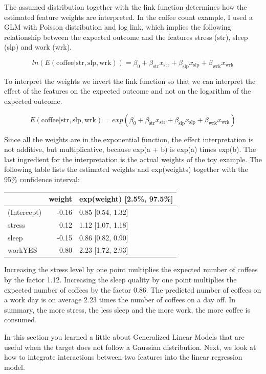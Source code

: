 \documentclass[
  12pt,
]{krantz}
\begin{document}
The assumed distribution together with the link function determines how the estimated feature weights are interpreted.
In the coffee count example, I used a GLM with Poisson distribution and log link, which implies the following relationship between the expected outcome and the features stress (str), sleep (slp) and work (wrk).

\[ln(E(\text{coffee}|\text{str},\text{slp},\text{wrk}))=\beta_0+\beta_{\text{str}}x_{\text{str}}+\beta_{\text{slp}}x_{\text{slp}}+\beta_{\text{wrk}}x_{\text{wrk}}\]

To interpret the weights we invert the link function so that we can interpret the effect of the features on the expected outcome and not on the logarithm of the expected outcome.

\[E(\text{coffee}|\text{str},\text{slp},\text{wrk})=exp(\beta_0+\beta_{\text{str}}x_{\text{str}}+\beta_{\text{slp}}x_{\text{slp}}+\beta_{\text{wrk}}x_{\text{wrk}})\]

Since all the weights are in the exponential function, the effect interpretation is not additive, but multiplicative, because exp(a + b) is exp(a) times exp(b).
The last ingredient for the interpretation is the actual weights of the toy example.
The following table lists the estimated weights and exp(weights) together with the 95\% confidence interval:

\begin{tabular}{l|r|l}
\hline
  & weight & exp(weight) [2.5\%, 97.5\%]\\
\hline
(Intercept) & -0.16 & 0.85 [0.54, 1.32]\\
\hline
stress & 0.12 & 1.12 [1.07, 1.18]\\
\hline
sleep & -0.15 & 0.86 [0.82, 0.90]\\
\hline
workYES & 0.80 & 2.23 [1.72, 2.93]\\
\hline
\end{tabular}

Increasing the stress level by one point multiplies the expected number of coffees by the factor 1.12.
Increasing the sleep quality by one point multiplies the expected number of coffees by the factor 0.86.
The predicted number of coffees on a work day is on average 2.23 times the number of coffees on a day off.
In summary, the more stress, the less sleep and the more work, the more coffee is consumed.

In this section you learned a little about Generalized Linear Models that are useful when the target does not follow a Gaussian distribution.
Next, we look at how to integrate interactions between two features into the linear regression model.
\end{document}
